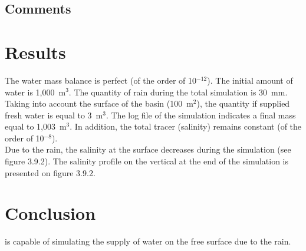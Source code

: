 \subsection{Comments}
%
%
%
\section{Results}
%
The water mass balance is perfect (of the order of 10$^{-12}$).
The initial amount of water is 1,000~m$^3$.
The quantity of rain during the total simulation is 30~mm.
Taking into account the surface of the basin (100~m$^2$), the quantity
if supplied fresh water is equal to 3~m$^3$.
The log file of the simulation indicates a final mass equal to
1,003~m$^3$.
In addition, the total tracer (salinity) remains constant (of the order
of 10$^{-8}$).\\
Due to the rain, the salinity at the surface decreases during the
simulation (see figure 3.9.2).
The salinity profile on the vertical at the end of the simulation is
presented on figure 3.9.2.
%
\section{Conclusion}
%
 is capable of simulating the supply of water on the free
surface due to the rain.
%
%
